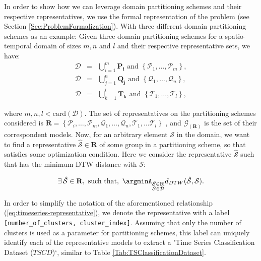 In order to show how we can leverage domain partitioning schemes and their respective representatives, we use the formal representation of the problem (see Section \ref{Sec:ProblemFormalization}). With three different domain partitioning schemes as an example: Given three domain partitioning schemes for a spatio-temporal domain of sizes $m, n$ and $l$ and their respective representative sets, we have:
\begin{eqnarray} 
\nonumber
\mathcal{D}	& = & \bigcup_{i=1}^{m} \mathbf{P_i} \,\,\textrm{and} \,\, \left\{\mathcal{P}_{1}, \ldots, \mathcal{P}_{m}\right\}, \\ \nonumber
\mathcal{D} & = & \bigcup_{j=1}^{n} \mathbf{Q_j} \,\,\textrm{and} \,\, \left\{\mathcal{Q}_{1}, \ldots, \mathcal{Q}_{n}\right\}, \\ \nonumber 
\mathcal{D} & = & \bigcup_{k=1}^{l} \mathbf{T_k} \,\,\textrm{and} \,\, \left\{\mathcal{T}_{1}, \ldots, \mathcal{T}_{l}\right\},
\end{eqnarray}

where $m, n, l < \textrm{card}(\mathcal{D})$. The set of representatives on the partitioning schemes considered is $\mathbf{R} = \left\{\mathcal{P}_{i}, \ldots, \mathcal{P}_{m}, \mathcal{Q}_{1}, \ldots, \mathcal{Q}_{n}, \mathcal{T}_{1}, \ldots \mathcal{T}_{l} \right\}$ , and $\mathcal{G}_{(\mathbf{R})}$ is the set of their correspondent models. Now, for an arbitrary element $\mathcal{S}$ in the domain, we want to find a representative $\mathcal{\hat{S}} \in \mathbf{R}$ of some group in a partitioning scheme, so that satisfies some optimization condition. Here we consider the representative $\mathcal{\hat{S}}$ such that has the minimum DTW distance with $\mathcal{S}$:

\begin{equation}\label{eq:timeseries-representative}
 \exists\, \mathcal{\hat{S}} \in \mathbf{R}, \,\, \textrm{such that}, \,\, \argminA_{\substack{\mathcal{\hat{S}} \in \mathbf{R}\\\mathcal{S} \in \mathcal{D}}} d_{DTW}(\mathcal{\hat{S}}, \mathcal{S}).
\end{equation}

In order to simplify the notation of the aforementioned relationship (\ref{eq:timeseries-representative}), we denote the representative with a label \texttt{[number\_of\_clusters, cluster\_index]}. Assuming that only the number of clusters is used as a parameter for partitioning schemes, this label can uniquely identify each of the representative models to extract a 'Time Series Classification Dataset ($TSCD$)`, similar to Table \ref{Tab:TSClassificationDataset}.

